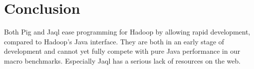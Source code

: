 \section{Conclusion}

Both Pig and Jaql ease programming for Hadoop by allowing rapid development, compared to Hadoop's Java interface. They are both in an early stage of development and cannot yet fully compete with pure Java performance in our macro benchmarks. Especially Jaql has a serious lack of resources on the web.